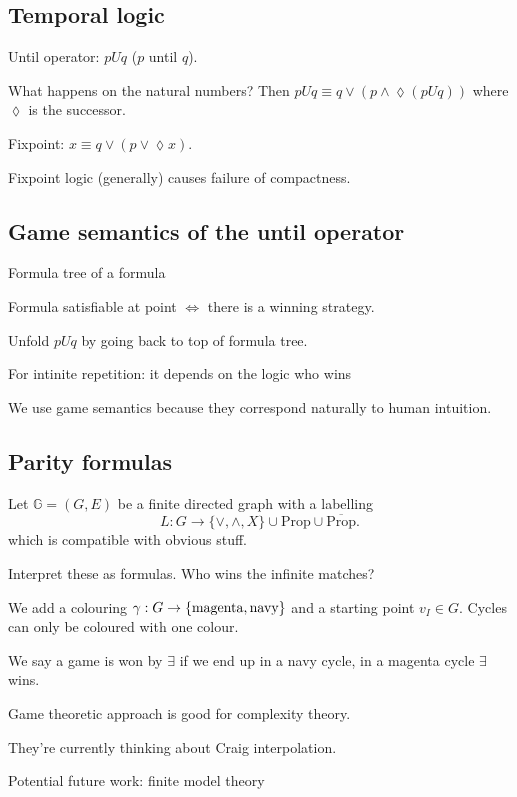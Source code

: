 \subsection{Temporal logic}
Until operator: \(pUq\) (\(p\) until \(q\)).

What happens on the natural numbers? Then \(pUq\equiv q\vee (p\wedge
\lozenge(pUq))\) where \(\lozenge\) is the successor.

Fixpoint: \(x\equiv q\vee(p\vee\lozenge x)\).

Fixpoint logic (generally) causes failure of compactness.

\subsection{Game semantics of the until operator}
Formula tree of a formula

Formula satisfiable at point \(\Leftrightarrow\) there is a winning strategy.

Unfold \(pUq\) by going back to top of formula tree.

For intinite repetition: it depends on the logic who wins

We use game semantics because they correspond naturally to human intuition.

\subsection{Parity formulas}
Let \(\mathbb{G}=(G,E)\) be a finite directed graph with a labelling
\[
    L:G\to\{\vee,\wedge,X\}\cup \text{Prop} \cup \overline{\text{Prop}}.
\]
which is compatible with obvious stuff.

Interpret these as formulas. Who wins the infinite matches?

We add a colouring \(\gamma:G\to\{\textnormal{magenta},\textnormal{navy}\}\) and
a starting point \(v_{I}\in G\). Cycles can only be coloured with one colour.

We say a game is won by \(\exists\) if we end up in a navy cycle, in a magenta
cycle \(\exists\) wins.

Game theoretic approach is good for complexity theory.

They're currently thinking about Craig interpolation.

Potential future work: finite model theory